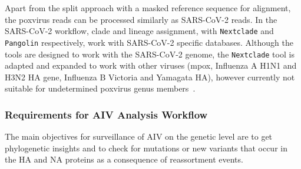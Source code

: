 Apart from the split approach with a masked reference sequence for alignment, the poxvirus reads can be processed similarly as \ac{SARS-CoV-2} reads. In the \ac{SARS-CoV-2} workflow, clade and lineage assignment, with \texttt{Nextclade} and \texttt{Pangolin} respectively, work with \ac{SARS-CoV-2} specific databases. Although the tools are designed to work with the \ac{SARS-CoV-2} genome, the \texttt{Nextclade} tool is adapted and expanded to work with other viruses (mpox, Influenza A H1N1 and H3N2 HA gene, Influenza B Victoria and Yamagata HA), however currently not suitable for undetermined poxvirus genus members~\cite{aksamentov2021nextclade}.

\subsubsection{Requirements for AIV Analysis Workflow}
The main objectives for surveillance of \ac{AIV} on the genetic level are to get phylogenetic insights and to check for mutations or new variants that occur in the \ac{HA} and \ac{NA} proteins as a consequence of reassortment events. \\
